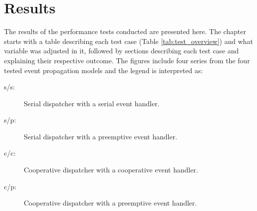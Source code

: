 \chapter{Results}
\label{cha:results}

The results of the performance tests conducted are presented here. The chapter
starts with a table describing each test case (Table \ref{tab:test_overview})
and what variable was adjusted in it, followed by sections describing each test
case and explaining their respective outcome. The figures include four series
from the four tested event propagation models and the legend is interpreted as:

\begin{description}

    \item[s/s:] Serial dispatcher with a serial event handler.
    \item[s/p:] Serial dispatcher with a preemptive event handler.
    \item[c/c:] Cooperative dispatcher with a cooperative event handler.
    \item[c/p:] Cooperative dispatcher with a preemptive event handler.

\end{description}

